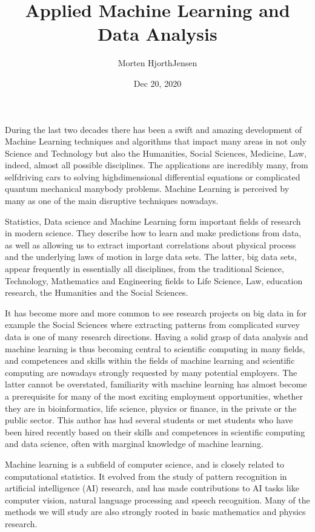 \documentclass[letterpaper,10pt,english]{sphinxmanual}
\title{Applied Machine Learning and Data Analysis}
\date{Dec 20, 2020}
\author{Morten Hjorth\sphinxhyphen{}Jensen}
\begin{document}
\pagestyle{empty}
\sphinxmaketitle
\pagestyle{plain}
\sphinxtableofcontents
\pagestyle{normal}
\label{\detokenize{chapter1::doc}}


During the last two decades there has been a swift and amazing
development of Machine Learning techniques and algorithms that impact
many areas in not only Science and Technology but also the Humanities,
Social Sciences, Medicine, Law, indeed, almost all possible
disciplines. The applications are incredibly many, from self\sphinxhyphen{}driving
cars to solving high\sphinxhyphen{}dimensional differential equations or complicated
quantum mechanical many\sphinxhyphen{}body problems. Machine Learning is perceived
by many as one of the main disruptive techniques nowadays.

Statistics, Data science and Machine Learning form important
fields of research in modern science.  They describe how to learn and
make predictions from data, as well as allowing us to extract
important correlations about physical process and the underlying laws
of motion in large data sets. The latter, big data sets, appear
frequently in essentially all disciplines, from the traditional
Science, Technology, Mathematics and Engineering fields to Life
Science, Law, education research, the Humanities and the Social
Sciences.

It has become more
and more common to see research projects on big data in for example
the Social Sciences where extracting patterns from complicated survey
data is one of many research directions.  Having a solid grasp of data
analysis and machine learning is thus becoming central to scientific
computing in many fields, and competences and skills within the fields
of machine learning and scientific computing are nowadays strongly
requested by many potential employers. The latter cannot be
overstated, familiarity with machine learning has almost become a
prerequisite for many of the most exciting employment opportunities,
whether they are in bioinformatics, life science, physics or finance,
in the private or the public sector. This author has had several
students or met students who have been hired recently based on their
skills and competences in scientific computing and data science, often
with marginal knowledge of machine learning.

Machine learning is a subfield of computer science, and is closely
related to computational statistics.  It evolved from the study of
pattern recognition in artificial intelligence (AI) research, and has
made contributions to AI tasks like computer vision, natural language
processing and speech recognition. Many of the methods we will study are also
strongly rooted in basic mathematics and physics research.
\end{document}
